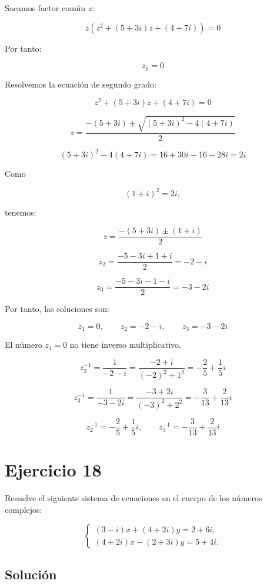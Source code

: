 \documentclass[fleqn]{article}
\begin{document}
		Sacamos factor común $z$:

		\[
		z\left(z^2+(5+3i)z+(4+7i)\right)=0
		\]

		Por tanto:

		\[
		z_1=0
		\]

		Resolvemos la ecuación de segundo grado:

		\[
		z^2+(5+3i)z+(4+7i)=0
		\]

		\[
		z
		=
		\frac{-(5+3i)\pm\sqrt{(5+3i)^2-4(4+7i)}}{2}
		\]

		\[
		(5+3i)^2-4(4+7i)
		=
		16+30i-16-28i
		=
		2i
		\]

		Como

		\[
		(1+i)^2=2i,
		\]

		tenemos:

		\[
		z
		=
		\frac{-(5+3i)\pm(1+i)}{2}
		\]

		\[
		z_2
		=
		\frac{-5-3i+1+i}{2}
		=
		-2-i
		\]

		\[
		z_3
		=
		\frac{-5-3i-1-i}{2}
		=
		-3-2i
		\]

		Por tanto, las soluciones son:

		\[
		\boxed{
		z_1=0,
		\qquad
		z_2=-2-i,
		\qquad
		z_3=-3-2i
		}
		\]

		El número $z_1=0$ no tiene inverso multiplicativo.

		\[
		z_2^{-1}
		=
		\frac{1}{-2-i}
		=
		\frac{-2+i}{(-2)^2+1^2}
		=
		-\frac{2}{5}+\frac{1}{5}i
		\]

		\[
		z_3^{-1}
		=
		\frac{1}{-3-2i}
		=
		\frac{-3+2i}{(-3)^2+2^2}
		=
		-\frac{3}{13}+\frac{2}{13}i
		\]

		\[
		\boxed{
		z_2^{-1}
		=
		-\frac{2}{5}+\frac{1}{5}i,
		\qquad
		z_3^{-1}
		=
		-\frac{3}{13}+\frac{2}{13}i
		}
		\]
	
	\section{Ejercicio 18}
		Resuelve el siguiente sistema de ecuaciones en el cuerpo de los números complejos:

		\[
		\begin{cases}
		(3-i)x+(4+2i)y=2+6i,\\
		(4+2i)x-(2+3i)y=5+4i.
		\end{cases}
		\]

		\subsection{Solución}
\end{document}
